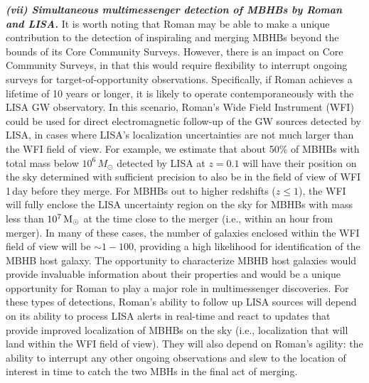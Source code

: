 \documentclass[tightenlines,superscriptaddress,amsmath,amssymb,prl,12pt]{revtex4-1}
\newcommand{\msun}{{\rm M}_\odot}
\begin{document}
\textbf{\it (vii) Simultaneous multimessenger detection of MBHBs by
  Roman and LISA.}  It is worth noting that Roman may be able to make
a unique contribution to the detection of inspiraling and merging
MBHBs beyond the bounds of its Core Community Surveys.  However, there
is an impact on Core Community Surveys, in that this would require
flexibility to interrupt ongoing surveys for target-of-opportunity
observations. Specifically, if Roman achieves a lifetime of 10 years
or longer, it is likely to operate contemporaneously with the LISA GW
observatory. In this scenario, Roman's Wide Field Instrument (WFI)
could be used for direct electromagnetic follow-up of the GW sources
detected by LISA, in cases where LISA's localization uncertainties are
not much larger than the WFI field of view. For example, we estimate
that about 50\% of MBHBs with total mass below $10^6\,M_\odot$
detected by LISA at $z=0.1$ will have their position on the sky
determined with sufficient precision to also be in the field of view
of WFI 1\,day before they merge. For MBHBs out to higher redshifts
($z\leq 1$), the WFI will fully enclose the LISA uncertainty region on
the sky for MBHBs with mass less than $10^7\,\msun$ at the time close
to the merger (i.e., within an hour from merger). In many of these
cases, the number of galaxies enclosed within the WFI field of view
will be $\sim 1-100$, providing a high likelihood for identification
of the MBHB host galaxy. The opportunity to characterize MBHB host
galaxies would provide invaluable information about their properties
and would be a unique opportunity for Roman to play a major role in
multimessenger discoveries. For these types of detections, Roman's
ability to follow up LISA sources will depend on its ability to
process LISA alerts in real-time and react to updates that provide
improved localization of MBHBs on the sky (i.e., localization that
will land within the WFI field of view). They will also depend on
Roman's agility: the ability to interrupt any other ongoing
observations and slew to the location of interest in time to catch the
two MBHs in the final act of merging.

\vspace{\baselineskip}


\clearpage
\newpage

\end{document}
